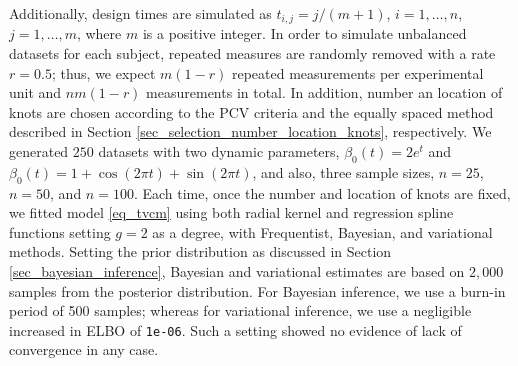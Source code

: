 \documentclass[letterpaper,10pt,openany]{article}
\begin{document}
Additionally, design times are simulated as $t_{i,j}=j/(m+1)$, $i=1,\ldots,n$, $j=1,\ldots,m$, where $m$ is a positive integer. In order to simulate unbalanced datasets for each subject, repeated measures are randomly removed with a rate $r=0.5$; thus, we expect $m(1-r)$ repeated measurements per experimental unit and $nm(1-r)$ measurements in total. In addition, {\color{black} number an location} of knots are chosen according to the \textsf{PCV} criteria {\color{black} and the equally spaced method} described in Section \ref{sec_selection_number_location_knots}, {\color{black} respectively.} We generated $250$ datasets with two dynamic parameters, $\beta_0(t) = 2e^t$ and $\beta_0(t) =  1 + \cos(2 \pi t) + \sin(2 \pi t)$, and also,  three sample sizes, $n=25$, $n=50$, and $n=100$. Each time, {\color{black} once the number and location of knots are fixed,} we fitted model \eqref{eq_tvcm} using both radial kernel and regression spline functions setting $g=2$ as a degree, with Frequentist, Bayesian, and variational methods. {\color{black} Setting the prior distribution as discussed in Section \ref{sec_bayesian_inference},} Bayesian and variational estimates are based on $2,000$ samples {\color{black} from the posterior distribution. For Bayesian inference, we use a burn-in period of 500 samples; whereas for variational inference, we use a negligible increased in \textsf{ELBO} of \texttt{1e-06}. Such a setting showed no evidence of lack of convergence in any case.}
\end{document}
